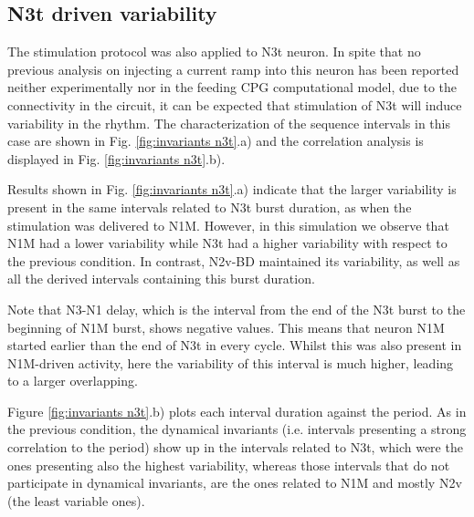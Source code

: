\subsection{N3t driven variability}
\label{subsec:n3t driven}

The stimulation protocol was also applied to N3t neuron. In spite that no previous analysis on injecting a current ramp into this neuron has been reported neither experimentally nor in the feeding CPG computational model, due to the connectivity in the circuit, it can be expected that stimulation of N3t will induce variability in the rhythm. The characterization of the sequence intervals in this case are shown in Fig. 
\ref{fig:invariants n3t}.a) and the correlation analysis is displayed in Fig. \ref{fig:invariants n3t}.b).


Results shown in Fig. \ref{fig:invariants n3t}.a) indicate that the larger variability is present in the same intervals related to N3t burst duration, as when the stimulation was delivered to N1M. However, in this simulation we observe that N1M had a lower variability while N3t had a higher variability with respect to the previous condition. 
In contrast, N2v-BD maintained its variability, as well as all the derived intervals containing this burst duration.

Note that N3-N1 delay, which is the interval from the end of the N3t burst to the beginning of N1M burst, shows negative values. This means that neuron N1M started earlier than the end of N3t in every cycle. Whilst this was also present in N1M-driven activity, here the variability of this interval is much higher, leading to a larger overlapping.

Figure \ref{fig:invariants n3t}.b) plots each interval duration against the period. As in the previous condition, the dynamical invariants (i.e. intervals presenting a strong correlation to the period) show up in the intervals related to N3t, which were the ones presenting also the highest variability, whereas those intervals that do not participate in dynamical invariants, are the ones related to N1M and mostly N2v (the least variable ones). 


